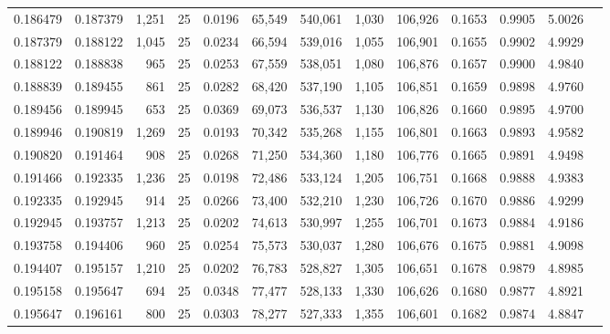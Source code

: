 \begin{tabular}{rrrrrrrrrrrrr}
0.186479 & 0.187379 & 1,251 &  25 &                                     0.0196 &  65,549 & 540,061 &   1,030 & 106,926 & 0.1653 & 0.9905 & 5.0026 \\
0.187379 & 0.188122 & 1,045 &  25 &                                     0.0234 &  66,594 & 539,016 &   1,055 & 106,901 & 0.1655 & 0.9902 & 4.9929 \\
0.188122 & 0.188838 &   965 &  25 &                                     0.0253 &  67,559 & 538,051 &   1,080 & 106,876 & 0.1657 & 0.9900 & 4.9840 \\
0.188839 & 0.189455 &   861 &  25 &                                     0.0282 &  68,420 & 537,190 &   1,105 & 106,851 & 0.1659 & 0.9898 & 4.9760 \\
0.189456 & 0.189945 &   653 &  25 &                                     0.0369 &  69,073 & 536,537 &   1,130 & 106,826 & 0.1660 & 0.9895 & 4.9700 \\
0.189946 & 0.190819 & 1,269 &  25 &                                     0.0193 &  70,342 & 535,268 &   1,155 & 106,801 & 0.1663 & 0.9893 & 4.9582 \\
0.190820 & 0.191464 &   908 &  25 &                                     0.0268 &  71,250 & 534,360 &   1,180 & 106,776 & 0.1665 & 0.9891 & 4.9498 \\
0.191466 & 0.192335 & 1,236 &  25 &                                     0.0198 &  72,486 & 533,124 &   1,205 & 106,751 & 0.1668 & 0.9888 & 4.9383 \\
0.192335 & 0.192945 &   914 &  25 &                                     0.0266 &  73,400 & 532,210 &   1,230 & 106,726 & 0.1670 & 0.9886 & 4.9299 \\
0.192945 & 0.193757 & 1,213 &  25 &                                     0.0202 &  74,613 & 530,997 &   1,255 & 106,701 & 0.1673 & 0.9884 & 4.9186 \\
0.193758 & 0.194406 &   960 &  25 &                                     0.0254 &  75,573 & 530,037 &   1,280 & 106,676 & 0.1675 & 0.9881 & 4.9098 \\
0.194407 & 0.195157 & 1,210 &  25 &                                     0.0202 &  76,783 & 528,827 &   1,305 & 106,651 & 0.1678 & 0.9879 & 4.8985 \\
0.195158 & 0.195647 &   694 &  25 &                                     0.0348 &  77,477 & 528,133 &   1,330 & 106,626 & 0.1680 & 0.9877 & 4.8921 \\
0.195647 & 0.196161 &   800 &  25 &                                     0.0303 &  78,277 & 527,333 &   1,355 & 106,601 & 0.1682 & 0.9874 & 4.8847 \\

\end{tabular}
